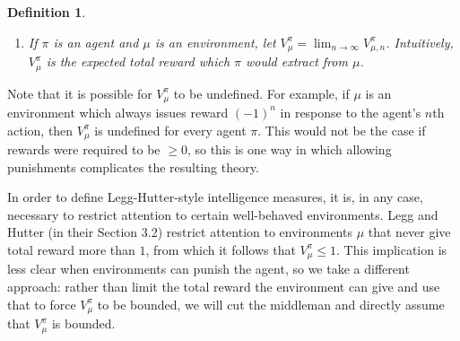 \documentclass{article}
\newtheorem{definition}[theorem]{Definition}
\begin{document}
\begin{definition}
\begin{enumerate}
        we write $V^\pi_{\mu,n}$ for the expected value of the sum of
        the first $n$ rewards which would occur in an ORA-sequence
        $(o_0,r_0,a_0,\ldots,o_n,r_n)$ randomly generated as follows:
        \begin{enumerate}
            \item $(o_0,r_0)\in \mathcal O\times\mathcal R$ is chosen randomly based
            on the probability measure $\mu(\langle\rangle)$.
            \item $a_0\in\mathcal A$ is chosen randomly based on the probability
            measure $\pi(o_0,r_0)$.
            \item
            For each $i>0$,
            $(o_i,r_i)\in\mathcal O\times\mathcal R$ is chosen randomly based on
            the probability measure $\mu(o_0,r_0,a_0,\ldots,o_{i-1},r_{i-1},a_{i-1})$.
            \item
            For each $i>0$,
            $a_i\in\mathcal A$ is chosen randomly based on the probability measure
            $\pi(o_0,r_0,a_0,\ldots,o_{i-1},r_{i-1},a_{i-1},o_i,r_i)$.
        \end{enumerate}
        \item
        If $\pi$ is an agent and $\mu$ is an environment,
        let $V^\pi_\mu=\lim_{n\to\infty}V^{\pi}_{\mu,n}$.
        Intuitively, $V^\pi_\mu$ is the expected total reward which $\pi$ would extract
        from $\mu$.
    \end{enumerate}
\end{definition}

Note that it is possible for $V^\pi_\mu$ to be undefined.
For example, if $\mu$ is an environment which always issues
reward $(-1)^n$ in response to the agent's $n$th action,
then $V^\pi_\mu$ is undefined for every agent $\pi$.
This would not be the case if rewards were required to be $\geq 0$,
so this is one way in which allowing
punishments complicates the resulting theory.

In order to define Legg-Hutter-style
intelligence measures, it is, in any case, necessary to restrict attention to
certain well-behaved environments. Legg and Hutter (in their Section 3.2)
restrict attention to environments $\mu$ that never give total reward more than $1$,
from which it follows that $V^\pi_\mu\leq 1$. This implication is less clear
when environments can punish the agent, so we take a different approach:
rather than limit the total reward the environment can give and use that to
force $V^\pi_\mu$ to be bounded, we will cut the middleman and
directly assume that $V^\pi_\mu$ is bounded.
\end{document}
